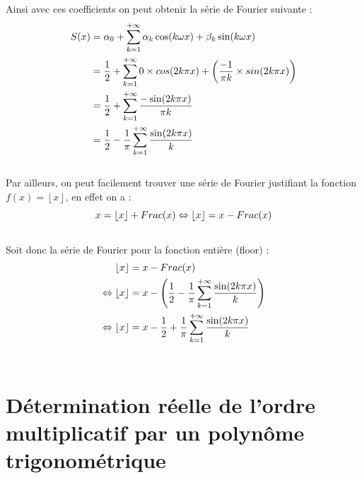 \documentclass{article}
\begin{document}
Ainsi avec ces coefficients on peut obtenir la série de Fourier suivante :
\begin{equation}
\begin{split}
S(x) & = \alpha_0 + \sum_{k=1}^{+\infty}\alpha_k\cos(k\omega x)+\beta_k\sin(k\omega x)
\\
& = \frac{1}{2}+\sum_{k=1}^{+\infty}0\times cos(2k\pi x)+\left(\frac{-1}{\pi k}\times sin(2k\pi x)\right)\\
& = \frac{1}{2}+\sum_{k=1}^{+\infty}\frac{-\sin(2k\pi x)}{\pi k}\\
& = \frac{1}{2}-\frac{1}{\pi}\sum_{k=1}^{+\infty}\frac{\sin(2k\pi x)}{k}\notag
\end{split}
\end{equation}\\
Par ailleurs, on peut facilement trouver une série de Fourier justifiant la fonction $f(x) = \left\lfloor x \right\rfloor$, en effet on a :
\begin{equation}
x = \left\lfloor x \right\rfloor + Frac(x) \Leftrightarrow \left\lfloor x \right\rfloor = x - Frac(x)\notag
\end{equation}\\
Soit donc la série de Fourier pour la fonction entière (floor) :\\
\begin{equation}
\begin{split}
\left\lfloor x \right\rfloor & = x - Frac(x)\\
\Leftrightarrow \left\lfloor x \right\rfloor & =  x-\left(\frac{1}{2}-\frac{1}{\pi}\sum_{k=1}^{+\infty}\frac{\sin(2k\pi x)}{k}\right)\\
\Leftrightarrow \left\lfloor x \right\rfloor & = x-\frac{1}{2}+\frac{1}{\pi}\sum_{k=1}^{+\infty}\frac{\sin(2k\pi x)}{k}\notag
\end{split}
\end{equation}\\

\section{Détermination réelle de l'ordre multiplicatif par un polynôme trigonométrique}
\end{document}
